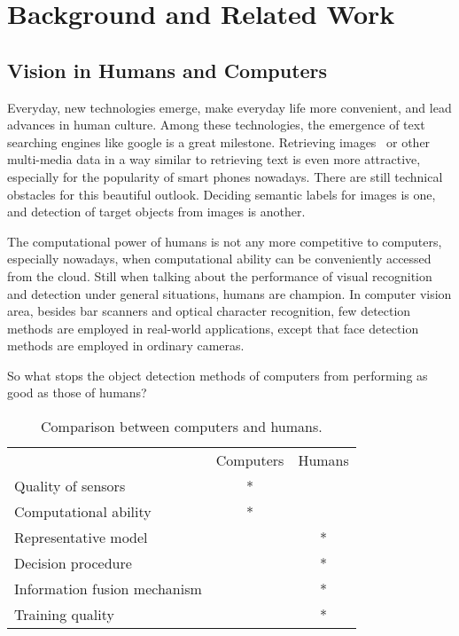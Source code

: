 \chapter{Background and Related Work}
\label{chp2}

\section{Vision in Humans and Computers}

Everyday, new technologies emerge, make everyday life more convenient, and lead advances in human culture. Among these technologies, the emergence of text searching engines like google is a great milestone. Retrieving images~\citep{bisearch} or other multi-media data  in a way similar to retrieving text is even more attractive, especially for the popularity of smart phones nowadays. There are still technical obstacles for this beautiful outlook. Deciding semantic labels for images is one, and detection of target objects from images is another.



The computational power of humans is not any more competitive to computers, especially nowadays, when computational ability can be conveniently accessed from the cloud.
Still when talking about the performance of visual recognition and detection under general situations, humans are champion. In computer vision area, besides bar scanners and optical character recognition, few detection methods are employed in real-world applications, except that face detection methods are employed in ordinary cameras.

So what stops the object detection methods of computers from performing as good as those of humans?

\begin{table}[h]
\centering
\begin{tabular}{lcc}
     \hline
     \hline
                               &	Computers & Humans \\
    Quality of sensors         &	* &   \\
    Computational ability      &	* &	  \\
    Representative model       &	  & * \\
    Decision procedure         &      & *	  \\
    Information fusion mechanism & & *           \\
    Training quality           &      & *	   \\
   \hline
\end{tabular}
\caption[Power comparison between computers and humans]{Comparison between computers and humans.}\label{c2tb:tb1}
\end{table}

